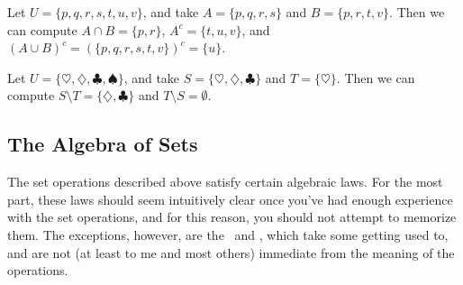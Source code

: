 \begin{example}
Let $U = \{p,q,r,s,t,u,v\}$, and take $A = \{p,q,r,s\}$ and $B = \{p,r,t,v\}$. Then we can compute $A \cap B = \{p,r\}$, $A^c = \{t,u,v\}$, and $(A \cup B)^c = (\{p,q,r,s,t,v\})^c = \{u\}$.
\end{example}

\begin{example}
Let $U = \{\heartsuit,\diamondsuit,\clubsuit,\spadesuit\}$, and take $S = \{\heartsuit,\diamondsuit,\clubsuit\}$ and $T = \{\heartsuit\}$. Then we can compute $S \setminus T = \{\diamondsuit,\clubsuit\}$ and $T \setminus S = \emptyset$.
\end{example}

\subsection*{The Algebra of Sets}

The set operations described above satisfy certain algebraic laws. For the most part, these laws should seem intuitively clear once you've had enough experience with the set operations, and for this reason, you should not attempt to memorize them. The exceptions, however, are the \ and , which take some getting used to, and are not (at least to me and most others) immediate from the meaning of the operations.


